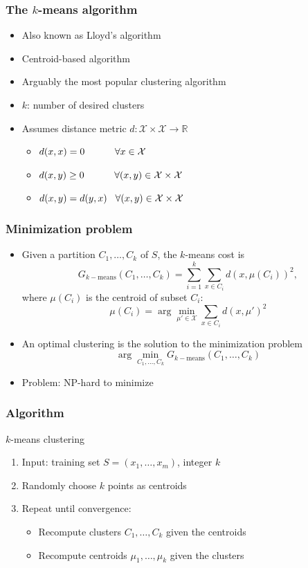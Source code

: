 \documentclass[10pt]{beamer}
\begin{document}
\begin{frame}
  \frametitle{The $k$-means algorithm}
  \begin{itemize}
    \item Also known as Lloyd's algorithm
    \item Centroid-based algorithm
	\item Arguably the most popular clustering algorithm
	\item $k$: number of desired clusters
	\item Assumes {\color{red} distance metric} $d:\mathcal{X}\times\mathcal{X}\rightarrow\mathbb{R}$
	\begin{itemize}
	\item $d(x,x) = 0 \hspace*{1.1cm} \forall x\in\mathcal{X}$
	\item $d(x,y) \geq 0 \hspace*{1.1cm} \forall (x,y) \in \mathcal{X} \times \mathcal{X}$
	\item $d(x,y) = d(y,x) \hspace*{.3cm} \forall (x,y) \in \mathcal{X} \times \mathcal{X}$
	\end{itemize}
  \end{itemize}
\end{frame}

\begin{frame}
  \frametitle{Minimization problem}
  \begin{itemize}
	\item Given a {\color{red} partition} $C_1,\ldots,C_k$ of $S$, the $k$-means cost is
	\[G_{k-\text{means}}(C_1,\ldots,C_k) = \sum_{i=1}^k\sum_{x\in C_i} d(x,\mu(C_i))^2,\]
	where $\mu(C_i)$ is the {\color{blue} centroid} of subset $C_i$:
	\[\mu(C_i) = \arg\min_{\mu'\in\mathcal{X}} \sum_{x\in C_i} d(x,\mu')^2\]
	\pause
	\item An optimal clustering is the solution to the minimization problem
	\[\arg\min_{C_1,\ldots,C_k} G_{k-\text{means}}(C_1,\ldots,C_k)\]
	\item {\color{red} Problem}: NP-hard to minimize
  \end{itemize}
\end{frame}

\begin{frame}
  \frametitle{Algorithm}
  \begin{block}{$k$-means clustering}
  \begin{enumerate}
    \item Input: training set $S=(x_1,\ldots,x_m)$, integer $k$
	\item Randomly choose $k$ points as centroids
	\item Repeat until convergence:
  \begin{itemize}
    \item Recompute clusters $C_1,\ldots,C_k$ given the centroids
	\item Recompute centroids $\mu_1,\ldots,\mu_k$ given the clusters
  \end{itemize}
  \end{enumerate}
  \end{block}
\end{frame}
\end{document}
